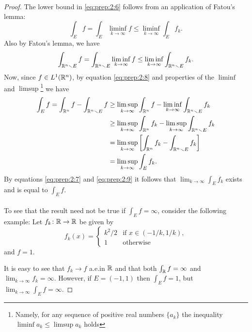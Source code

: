 \begin{proof}
The lower bound in \eqref{eq:prep:2:6} follows from an application of
Fatou's lemma:
\begin{equation}
  \label{eq:prep:2:7}
\int_E f=\int_E\liminf_{k\to\infty} f\leq\liminf_{k\to\infty}\int_E f_k.
\end{equation}
Also by Fatou's lemma, we have
\begin{equation}
  \label{eq:prep:2:8}
\int_{\mathbb{R}^n\smallsetminus E}f=\int_{\mathbb{R}^n\smallsetminus
  E}\liminf_{k\to\infty}f\leq\liminf_{k\to\infty}\int_{\mathbb{R}^n\smallsetminus E}f_k.
\end{equation}
Now, since $f\in L^1(\mathbb{R}^n)$, by equation \eqref{eq:prep:2:8} and
properties of the $\liminf$ and $\limsup$\footnote{Namely, for any sequence
  of positive real numbers $\{a_k\}$ the inequality $\liminf a_k\leq\limsup
  a_k$ holds} we have
\begin{equation}
\label{eq:prep:2:9}
\begin{aligned}
\int_Ef=\int_{\mathbb{R}^n}f-\int_{\mathbb{R}^n\smallsetminus E}f
&\geq\limsup_{k\to\infty}\int_{\mathbb{R}^n}f-\liminf_{k\to\infty}\int_{\mathbb{R}^n\smallsetminus
E}f_k\\
&\geq\limsup_{k\to\infty}\int_{\mathbb{R}^n}f_k-\limsup_{k\to\infty}\int_{\mathbb{R}^n\smallsetminus
  E}f_k\\
&=\limsup_{k\to\infty}\left[\int_{\mathbb{R}^n}f_k-\int_{\mathbb{R}^n\smallsetminus
    E}f_k\right]\\
&=\limsup_{k\to\infty}\int_Ef_k.
\end{aligned}
\end{equation}
By equations \eqref{eq:prep:2:7} and \eqref{eq:prep:2:9} it follows
that $\lim_{k\to\infty}\int_E f_k$ exists and is equal to $\int_E f$.
\\\\
To see that the result need not be true if $\int_Ef=\infty$, consider the
following example: Let $f_k\colon\mathbb{R}\to\mathbb{R}$ be given by
\begin{equation}
\label{eq:prep:2:11}
f_k(x)=
\begin{cases}
k^2/2&\text{if $x\in(-1/k,1/k)$},\\
1&\text{otherwise}
\end{cases}
\end{equation}
and $f=1$.

It is easy to see that $f_k\to f$ a.e.\@ in $\mathbb{R}$ and that both $\int_{\mathbb{R}}
f=\infty$ and $\lim_{k\to\infty}f_k=\infty$. However, if $E=(-1,1)$
then $\int_E f=1$, but $\lim_{k\to\infty}\int_Ef=\infty$.
\end{proof}

